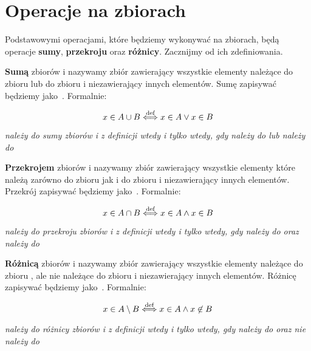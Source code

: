 \section{Operacje na zbiorach}
Podstawowymi operacjami, które będziemy wykonywać na zbiorach, będą operacje \textbf{sumy}, \textbf{przekroju} oraz \textbf{różnicy}. Zacznijmy od ich zdefiniowania.

\begin{definition}
\textbf{Sumą} zbiorów  i  nazywamy zbiór zawierający wszystkie elementy należące do zbioru  lub do zbioru  i niezawierający innych elementów. Sumę zapisywać będziemy jako~. Formalnie:

\[
x \in A \cup B \stackrel{\text{def}}{\Longleftrightarrow} x \in A \vee x \in B
\]
\begin{center}
    \textit{ należy do sumy zbiorów  i  z definicji wtedy i tylko wtedy, gdy  należy do  lub  należy do }
\end{center}
\end{definition}

\begin{definition}
\textbf{Przekrojem} zbiorów  i  nazywamy zbiór zawierający wszystkie elementy które należą zarówno do zbioru  jak i do zbioru  i niezawierający innych elementów. Przekrój zapisywać będziemy jako~. Formalnie:

\[
x \in A \cap B \stackrel{\text{def}}{\Longleftrightarrow} x \in A \wedge x \in B
\]
\begin{center}
    \textit{ należy do przekroju zbiorów  i  z definicji wtedy i tylko wtedy, gdy  należy do  oraz  należy do }
\end{center}
\end{definition}

\begin{definition}
\textbf{Różnicą} zbiorów  i  nazywamy zbiór zawierający wszystkie elementy należące do zbioru , ale nie należące do zbioru  i niezawierający innych elementów. Różnicę zapisywać będziemy jako~. Formalnie:

\[
x \in A \setminus B \stackrel{\text{def}}{\Longleftrightarrow} x \in A \wedge x \not\in B
\]
\begin{center}
    \textit{ należy do różnicy zbiorów  i  z definicji wtedy i tylko wtedy, gdy  należy do  oraz  nie należy do }
\end{center}
\end{definition}

